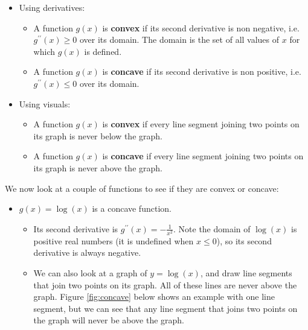 \documentclass[
]{book}
\providecommand{\tightlist}{%
  \setlength{\itemsep}{0pt}\setlength{\parskip}{0pt}}
\begin{document}
\begin{itemize}
\tightlist
\item
  Using derivatives:

  \begin{itemize}
  \tightlist
  \item
    A function \(g(x)\) is \textbf{convex} if its second derivative is non negative, i.e.~\(g^{\prime \prime}(x) \geq 0\) over its domain. The domain is the set of all values of \(x\) for which \(g(x)\) is defined.
  \item
    A function \(g(x)\) is \textbf{concave} if its second derivative is non positive, i.e.~\(g^{\prime \prime}(x) \leq 0\) over its domain.
  \end{itemize}
\item
  Using visuals:

  \begin{itemize}
  \tightlist
  \item
    A function \(g(x)\) is \textbf{convex} if every line segment joining two points on its graph is never below the graph.
  \item
    A function \(g(x)\) is \textbf{concave} if every line segment joining two points on its graph is never above the graph.
  \end{itemize}
\end{itemize}

We now look at a couple of functions to see if they are convex or concave:

\begin{itemize}
\tightlist
\item
  \(g(x) = \log(x)\) is a concave function.

  \begin{itemize}
  \tightlist
  \item
    Its second derivative is \(g^{\prime \prime}(x) = -\frac{1}{x^2}\). Note the domain of \(\log(x)\) is positive real numbers (it is undefined when \(x \leq 0\)), so its second derivative is always negative.
  \item
    We can also look at a graph of \(y = \log(x)\), and draw line segments that join two points on its graph. All of these lines are never above the graph. Figure \ref{fig:concave} below shows an example with one line segment, but we can see that any line segment that joins two points on the graph will never be above the graph.
  \end{itemize}
\end{itemize}
\end{document}
